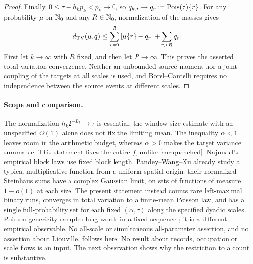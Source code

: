 \begin{proof}
Finally, $0\le\tau-h_kp_k<p_k\to0$, so
$q_{k,r}\to q_r:=\operatorname{Pois}(\tau)\{r\}$. For any probability $\mu$ on
$\mathbb N_0$ and any $R\in\mathbb N_0$, normalization of the masses gives
\[
 d_{\mathrm{TV}}(\mu,q)
 \le\sum_{r=0}^{R}|\mu\{r\}-q_r|+\sum_{r>R}q_r.
\]
First let $k\to\infty$ with $R$ fixed, and then let $R\to\infty$.
This proves the asserted total-variation convergence. Neither an
unbounded source moment nor a joint coupling of the targets at all
scales is used, and Borel--Cantelli requires no independence between
the source events at different scales.
\end{proof}

\paragraph{Scope and comparison.}
The normalization $h_k2^{-L_k}\to\tau$ is essential: the window-size
estimate with an unspecified $O(1)$ alone does not fix the limiting
mean. The inequality $\alpha<1$ leaves room in the arithmetic budget,
whereas $\alpha>0$ makes the target variance summable. This statement
fixes the entire $f$, unlike \cref{cor:quenched}. Najnudel's empirical
block laws \cite{Najnudel2020} use fixed block length.
Pandey--Wang--Xu \cite[arXiv version 4, Theorem~1.2 and footnote~1]{PandeyWangXu2024}
already study a typical multiplicative function from a uniform spatial
origin: their normalized Steinhaus sums have a complex Gaussian limit,
on sets of functions of measure $1-o(1)$ at each size. The present
statement instead counts rare left-maximal binary runs, converges in
total variation to a finite-mean Poisson law, and has a single
full-probability set for each fixed $(\alpha,\tau)$ along the specified
dyadic scales. Poisson genericity samples long words in a fixed sequence
\cite{AlvarezBecherMereb2023,AlvarezEtAlPoissonGenericity}; it is a different empirical
observable. No all-scale or simultaneous all-parameter assertion, and no
assertion about Liouville, follows here. No result about records,
occupation or scale flows is an input. The next observation shows why
the restriction to a count is substantive.

